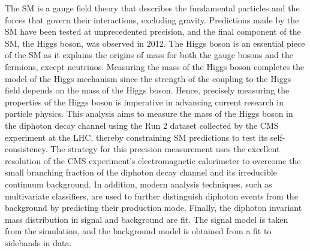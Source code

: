 The SM is a gauge field theory that describes the fundamental particles and the forces that govern their interactions, excluding gravity. Predictions made by the SM have been tested at unprecedented precision, and the final component of the SM, the Higgs boson, was observed in 2012. The Higgs boson is an essential piece of the SM as it explains the origins of mass for both the gauge bosons and the fermions, except neutrinos. Measuring the mass of the Higgs boson completes the model of the Higgs mechanism since the strength of the coupling to the Higgs field depends on the mass of the Higgs boson. Hence, precisely measuring the properties of the Higgs boson is imperative in advancing current research in particle physics. This analysis aims to measure the mass of the Higgs boson in the diphoton decay channel using the Run 2 dataset collected by the CMS experiment at the LHC, thereby constraining SM predictions to test its self-consistency. The strategy for this precision measurement uses the excellent resolution of the CMS experiment's electromagnetic calorimeter to overcome the small branching fraction of the diphoton decay channel and its irreducible continuum background. In addition, modern analysis techniques, such as multivariate classifiers, are used to further distinguish diphoton events from the background by predicting their production mode. Finally, the diphoton invariant mass distribution in signal and background are fit. The signal model is taken from the simulation, and the background model is obtained from a fit to sidebands in data.